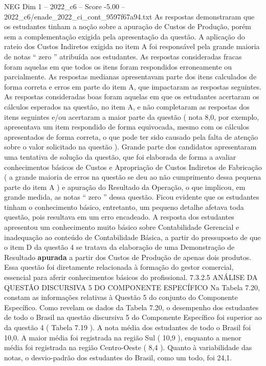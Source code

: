 \begin{textsample}{NEG Dim 1 – 2022\_c6 – Score -5.00 – 2022\_c6/enade\_2022\_ci\_cont\_9597f67a94.txt}
As respostas demonstraram que os estudantes tinham a noção sobre a apuração de Custos de Produção, porém sem a complementação exigida pela apresentação da questão.
A aplicação do rateio dos Custos Indiretos exigida no item A foi responsável pela grande maioria de notas “ zero ” atribuída aos estudantes.
As respostas consideradas fracas foram aquelas em que todos os itens foram respondidos erroneamente ou parcialmente.
As respostas medianas apresentavam parte dos itens calculados de forma correta e erros em parte do item A, que impactaram as respostas seguintes.
As respostas consideradas boas foram aquelas em que os estudantes acertaram os cálculos esperados na questão, no item A, e não completaram as respostas dos itens seguintes e/ou acertaram a maior parte da questão ( nota 8,0, por exemplo, apresentava um item respondido de forma equivocada, mesmo com os cálculos apresentados de forma correta, o que pode ter sido causado pela falta de atenção sobre o valor solicitado na questão ).
Grande parte dos candidatos apresentaram uma tentativa de solução da questão, que foi elaborada de forma a avaliar conhecimentos básicos de Custos e Apropriação de Custos Indiretos de Fabricação ( a grande maioria de erros na questão se deu ao não cumprimento dessa pequena parte do item A ) e apuração do Resultado da Operação, o que implicou, em grande medida, as notas “ zero ” dessa questão.
Ficou evidente que os estudantes tinham o conhecimento básico, entretanto, um pequeno detalhe afetava toda questão, pois resultava em um erro encadeado.
A resposta dos estudantes apresentou um conhecimento muito básico sobre Contabilidade Gerencial e inadequação ao conteúdo de Contabilidade Básica, a partir do pressuposto de que o item D da questão 4 se tratava da elaboração de uma Demonstração de Resultado \textbf{apurada} a partir dos Custos de Produção de apenas dois produtos.
Essa questão foi diretamente relacionada à formação do gestor comercial, essencial para aferir conhecimentos básicos do profissional. 7.3.2.5 ANÁLISE DA QUESTÃO DISCURSIVA 5 DO COMPONENTE ESPECÍFICO Na Tabela 7.20, constam as informações relativas à Questão 5 do conjunto do Componente Específico.
Como revelam os dados da Tabela 7.20, o desempenho dos estudantes de todo o Brasil na questão discursiva 5 do Componente Específico foi superior ao da questão 4 ( Tabela 7.19 ).
A nota média dos estudantes de todo o Brasil foi 10,0.
A maior média foi registrada na região Sul ( 10,9 ), enquanto a menor média foi registrada na região Centro-Oeste ( 8,4 ).
Quanto à variabilidade das notas, o desvio-padrão dos estudantes do Brasil, como um todo, foi 24,1.

\end{textsample}

